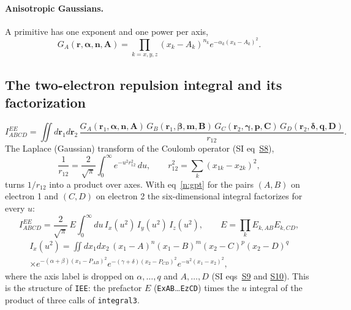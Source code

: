 \documentclass[11pt]{article}
\begin{document}
\paragraph{Anisotropic Gaussians.}  A primitive has one exponent and one power per axis,
\begin{equation}
G_A(\mathbf r,\boldsymbol\alpha,\mathbf n,\mathbf A)=\prod_{k=x,y,z}(x_k-A_k)^{n_k}e^{-\alpha_k(x_k-A_k)^2}.
\label{n:prim}
\end{equation}

\subsection{The two-electron repulsion integral and its factorization}
\begin{equation}
I^{EE}_{ABCD}=\iint d\mathbf r_1d\mathbf r_2\,
\frac{G_A(\mathbf r_1,\boldsymbol\alpha,\mathbf n,\mathbf A)\,G_B(\mathbf r_1,\boldsymbol\beta,\mathbf m,\mathbf B)\,
G_C(\mathbf r_2,\boldsymbol\gamma,\mathbf p,\mathbf C)\,G_D(\mathbf r_2,\boldsymbol\delta,\mathbf q,\mathbf D)}{r_{12}} .
\label{n:eri-def}
\end{equation}
The Laplace (Gaussian) transform of the Coulomb operator (SI eq~\href{si.pdf\#equation.8}{S8}),
\begin{equation}
\frac1{r_{12}}=\frac{2}{\sqrt\pi}\int_0^\infty e^{-u^2r_{12}^2}\,du,\qquad
r_{12}^2=\sum_k(x_{1k}-x_{2k})^2,
\label{n:coulomb}
\end{equation}
turns $1/r_{12}$ into a product over axes.  With eq~\ref{n:gpt} for the pairs $(A,B)$ on electron 1 and
$(C,D)$ on electron 2 the six-dimensional integral factorizes for every $u$:
\begin{equation}
I^{EE}_{ABCD}=\frac{2}{\sqrt\pi}\,E\int_0^\infty du\,I_x(u^2)\,I_y(u^2)\,I_z(u^2),\qquad
E=\prod_kE_{k,AB}E_{k,CD},
\label{n:eri-u}
\end{equation}
\begin{multline}
I_x(u^2)=\iint dx_1dx_2\,(x_1-A)^{n}(x_1-B)^{m}(x_2-C)^{p}(x_2-D)^{q}\\
\times e^{-(\alpha+\beta)(x_1-P_{AB})^2}e^{-(\gamma+\delta)(x_2-P_{CD})^2}e^{-u^2(x_1-x_2)^2},
\label{n:Ix}
\end{multline}
where the axis label is dropped on $\alpha,\ldots,q$ and $A,\ldots,D$ (SI eqs~\href{si.pdf\#equation.9}{S9} and
\href{si.pdf\#equation.10}{S10}).  This is the structure of \texttt{IEE}: the prefactor $E$ (\texttt{ExAB}\ldots\texttt{EzCD})
times the $u$ integral of the product of three calls of \texttt{integral3}.
\end{document}

